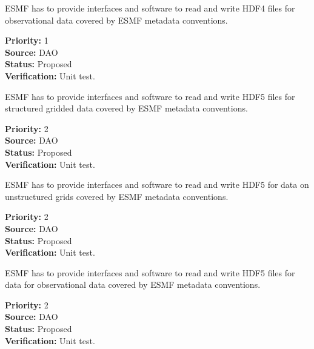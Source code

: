
ESMF has to provide interfaces and software to read and write HDF4
files for observational data  covered by ESMF metadata conventions.
 

\begin{reqlist}
{\bf Priority:} 1 \\
{\bf Source:} DAO \\
{\bf Status:} Proposed \\
{\bf Verification:} Unit test. \\
\end{reqlist}


ESMF has to provide interfaces and software to read and write HDF5
files for structured gridded data covered by ESMF metadata conventions.

\begin{reqlist}
{\bf Priority:} 2 \\
{\bf Source:} DAO \\
{\bf Status:} Proposed \\
{\bf Verification:} Unit test. 
\end{reqlist}




ESMF has to provide interfaces and software to read and write HDF5 for data 
on unstructured grids covered by ESMF metadata conventions.

\begin{reqlist}
{\bf Priority:} 2 \\
{\bf Source:} DAO \\
{\bf Status:} Proposed \\
{\bf Verification:} Unit test. 
\end{reqlist}



ESMF has to provide interfaces and software to read and write HDF5
files for data for observational data  covered by ESMF metadata conventions.

\begin{reqlist}
{\bf Priority:} 2 \\
{\bf Source:} DAO \\
{\bf Status:} Proposed \\
{\bf Verification:} Unit test. 
\end{reqlist}



